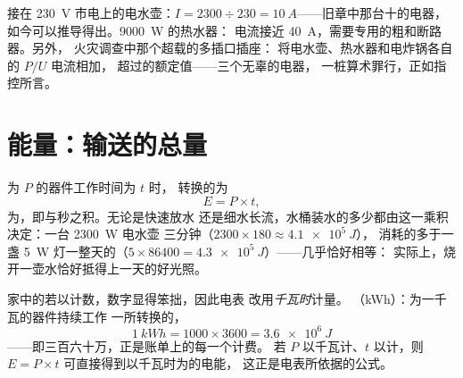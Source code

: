 \begin{example}[保险丝盒的计算]\label{ex:g9:electric-power-energy:fuses}
接在 \qty{230}{V} 市电上的电水壶：$I = 2300 \div 230 =
\qty{10}{A}$——旧章中那台十的电器，
如今可以推导得出。\qty{9000}{W} 的热水器：
电流接近 \qty{40}{A}，需要专用的粗和断路器。另外，
火灾调查中那个超载的多插口插座：
将电水壶、热水器和电炸锅各自的 $P/U$ 电流相加，
超过的额定值——三个无辜的电器，
一桩算术罪行，正如指控所言。
\end{example}

\section{能量：输送的总量}

\begin{proposition}[由功率与时间求能量]\label{prop:g9:electric-power-energy:Pt}
为 $P$ 的器件工作时间为 $t$ 时，
转换的为
\[
E = P \times t ,
\]
为，即与秒之积。无论是快速放水
还是细水长流，水桶装水的多少都由这一乘积决定：一台 \qty{2300}{W} 电水壶
三分钟（$2300 \times 180 \approx \qty{4.1e5}{J}$），
消耗的多于一盏 \qty{5}{W} 灯一整天的（$5 \times
86400 = \qty{4.3e5}{J}$）——几乎恰好相等：
实际上，烧开一壶水恰好抵得上一天的好光照。
\end{proposition}

\begin{definition}[千瓦时]\label{def:g9:electric-power-energy:kwh}
家中的若以计数，数字显得笨拙，因此电表
改用\emph{千瓦时}计量。
（\unit{kWh}）：为一千瓦的器件持续工作
一所转换的，
\[
\qty{1}{kWh} = 1000 \times 3600 = \qty{3.6e6}{J}
\]
——即三百六十万，正是账单上的每一个计费。
若 $P$ 以千瓦计、$t$ 以计，则 $E = P \times t$
可直接得到以千瓦时为的电能，
这正是电表所依据的公式。
\end{definition}

